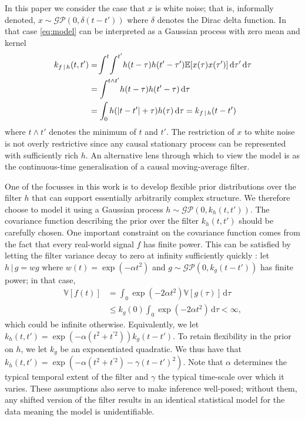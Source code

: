 \documentclass{article}
\newcommand{\id}[1]{\, \mathrm{d} #1}     %
\newcommand{\cond}{\, | \,}               %
\begin{document}
In this paper we consider the case that $x$ is white noise; that is, informally denoted, $x \sim \mathcal{GP}(0,\delta(t-t'))$ where $\delta$ denotes the Dirac delta function. In that case \cref{eq:model} can be interpreted as a Gaussian process with zero mean and kernel
\begin{align}
    k_{f\cond h}(t,t')&= \!\int^t \! \int^{t'}\!h(t- \tau) \vspace{-1mm} h(t'- \tau')
        \mathbb{E}[ x(\tau) x(\tau')]\id{\tau'} \id{\tau} \nonumber \\
    &= \int^{t \land t'} \! h(t - \tau) h(t' - \tau) \id{\tau} \nonumber \\
    &= \int_0 h(|t - t'| + \tau)h(\tau) \id{\tau} = k_{f\cond h}(t-t')  \label{eq:kernel}
\end{align}
where $t \land t'$ denotes the minimum of $t$ and $t'$. The restriction of $x$ to white noise is not overly restrictive since any causal stationary process can be represented with sufficiently rich $h$. An alternative lens through which to view the model is as the continuous-time generalisation of a causal moving-average filter.

One of the focusses in this work is to develop flexible prior distributions over the filter $h$ that can support essentially arbitrarily complex structure. We therefore choose to model it using a Gaussian process $h \sim \mathcal{GP}(0,k_h(t,t'))$. The covariance function describing the prior over the filter $k_h(t,t')$ should be carefully chosen. One important constraint on the covariance function comes from the fact that every real-world signal $f$ has finite power. This can be satisfied by letting the filter variance decay to zero at infinity sufficiently quickly \cite{Tobar:2015:Learning_Stationary}: let $h\cond g = w g$ where $w(t)= \exp(- \alpha t^2)$ and $g \sim \mathcal{GP}(0,k_g(t-t'))$ has finite power; in that case, %
\begin{align*}
    \mathbb{V}[f(t)]
    &= \int_{0}\exp(-2 \alpha t^2)\mathbb{V}[g(\tau)]\id{\tau} \\
    &\le k_g(0) \int_0 \exp(- 2 \alpha t^2) \id{\tau} < \infty,
\end{align*}
which could be infinite otherwise.
Equivalently, we let $k_h(t,t')=\exp(- \alpha (t^2 + t^{\prime 2}))k_g(t-t')$. To retain flexibility in the prior on $h$, we let $k_g$ be an exponentiated quadratic. We thus have that $k_h(t,t')=\exp(- \alpha (t^2 + t^{\prime 2}) - \gamma(t-t')^2)$. Note that $\alpha$ determines the typical temporal extent of the filter and $\gamma$ the typical time-scale over which it varies. These assumptions also serve to make inference well-posed; without them, any shifted version of the filter results in an identical statistical model for the data meaning the model is unidentifiable.
\end{document}
